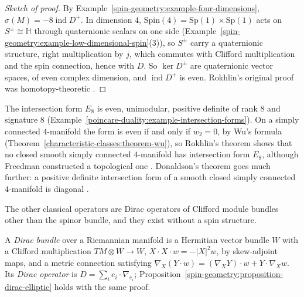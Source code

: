 \begin{proof}[Sketch of proof]
By Example~\ref{spin-geometry:example-four-dimensions}, $\sigma(M) = -8\operatorname{ind}D^+$. In dimension $4$, $\mathrm{Spin}(4) = \mathrm{Sp}(1) \times \mathrm{Sp}(1)$ acts on $S^\pm \cong \mathbb{H}$ through quaternionic scalars on one
side (Example~\ref{spin-geometry:example-low-dimensional-spin}(3)), so $S^\pm$ carry a quaternionic structure, right multiplication by $j$, which commutes with Clifford multiplication and the spin connection, hence with $D$.
So $\ker D^\pm$ are quaternionic vector spaces, of even complex dimension, and $\operatorname{ind}D^+$ is even. Rokhlin's original proof was homotopy-theoretic \cite{lawson-michelsohn}.
\end{proof}

\begin{remark}\label{spin-geometry:remark-rokhlin-consequences}
The intersection form $E_8$ is even, unimodular, positive definite of rank $8$ and signature $8$ (Example~\ref{poincare-duality:example-intersection-forms}). On a simply connected $4$-manifold the form is even if and only if $w_2 = 0$, by Wu's formula (Theorem~\ref{characteristic-classes:theorem-wu}), so
Rokhlin's theorem shows that no closed smooth simply connected $4$-manifold has intersection form $E_8$, although Freedman constructed a topological one \cite{freedman-1982}. Donaldson's theorem goes much further: a positive
definite intersection form of a smooth closed simply connected $4$-manifold is diagonal \cite{donaldson-1983}.
\end{remark}

The other classical operators are Dirac operators of Clifford module bundles other than the spinor bundle, and they exist without a spin structure.

\begin{definition}\label{spin-geometry:definition-dirac-bundle}
A \emph{Dirac bundle} over a Riemannian manifold is a Hermitian vector bundle $W$ with a Clifford multiplication $TM \otimes W \to W$, $X \cdot X \cdot w = -|X|^2w$, by skew-adjoint maps, and a metric connection satisfying
$\nabla_X(Y \cdot w) = (\nabla_XY) \cdot w + Y \cdot \nabla_Xw$. Its \emph{Dirac operator} is $D = \sum_ie_i \cdot \nabla_{e_i}$; Proposition~\ref{spin-geometry:proposition-dirac-elliptic} holds with the same proof.
\end{definition}

